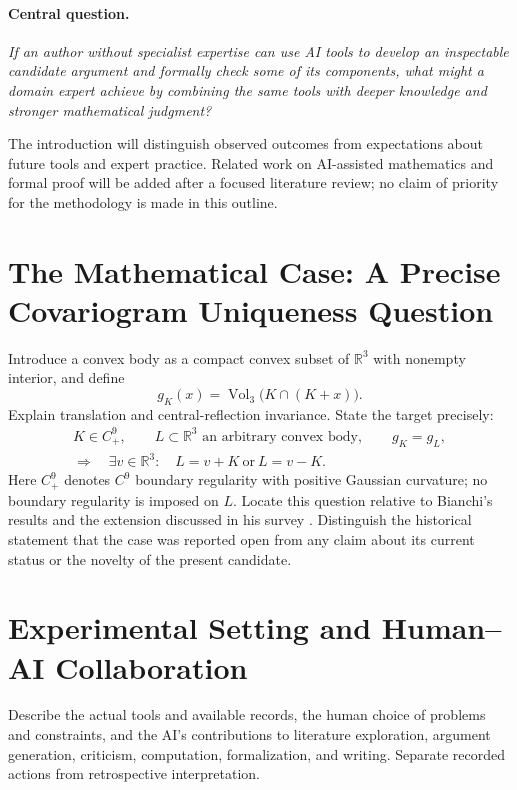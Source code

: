 \documentclass[11pt,a4paper]{article}
\begin{document}
\paragraph{Central question.}
\emph{If an author without specialist expertise can use AI tools to develop
an inspectable candidate argument and formally check some of its components,
what might a domain expert achieve by combining the same tools with deeper
knowledge and stronger mathematical judgment?}

The introduction will distinguish observed outcomes from expectations about
future tools and expert practice. Related work on AI-assisted mathematics and
formal proof will be added after a focused literature review; no claim of
priority for the methodology is made in this outline.

\section{The Mathematical Case: A Precise Covariogram Uniqueness Question}
Introduce a convex body as a compact convex subset of $\mathbb R^3$ with
nonempty interior, and define
\[
 g_K(x)=\operatorname{Vol}_3\bigl(K\cap(K+x)\bigr).
\]
Explain translation and central-reflection invariance. State the target
precisely:
\[
\begin{gathered}
 K\in C^9_+,\qquad L\subset\mathbb R^3\text{ an arbitrary convex body},
 \qquad g_K=g_L,\\
 \Longrightarrow\quad
 \exists v\in\mathbb R^3:\quad L=v+K\ \text{or}\ L=v-K.
\end{gathered}
\]
Here $C^9_+$ denotes $C^9$ boundary regularity with positive Gaussian curvature;
no boundary regularity is imposed on $L$. Locate this question relative to
Bianchi's results and the extension discussed in his survey
\cite{Bianchi2016,Bianchi2023}. Distinguish the historical statement that the
case was reported open from any claim about its current status or the novelty
of the present candidate.

\section{Experimental Setting and Human--AI Collaboration}
Describe the actual tools and available records, the human choice of problems
and constraints, and the AI's contributions to literature exploration,
argument generation, criticism, computation, formalization, and writing.
Separate recorded actions from retrospective interpretation.
\end{document}
